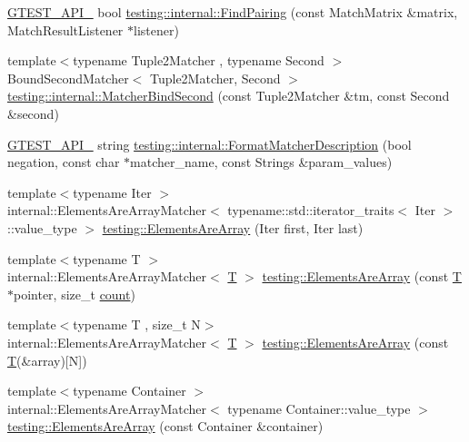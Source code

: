\begin{DoxyCompactItemize}
\hyperlink{gtest-port_8h_aa73be6f0ba4a7456180a94904ce17790}{G\+T\+E\+S\+T\+\_\+\+A\+P\+I\+\_\+} bool \hyperlink{namespacetesting_1_1internal_af2bd2e350b56422a3d9d3b986ac1df0e}{testing\+::internal\+::\+Find\+Pairing} (const Match\+Matrix \&matrix, Match\+Result\+Listener $\ast$listener)
\item 
{\footnotesize template$<$typename Tuple2\+Matcher , typename Second $>$ }\\Bound\+Second\+Matcher$<$ Tuple2\+Matcher, Second $>$ \hyperlink{namespacetesting_1_1internal_a31eb77a2bb0ca713d6ef07d8a3b9af9e}{testing\+::internal\+::\+Matcher\+Bind\+Second} (const Tuple2\+Matcher \&tm, const Second \&second)
\item 
\hyperlink{gtest-port_8h_aa73be6f0ba4a7456180a94904ce17790}{G\+T\+E\+S\+T\+\_\+\+A\+P\+I\+\_\+} string \hyperlink{namespacetesting_1_1internal_a593b52fcbb46a765a31850661b1960f4}{testing\+::internal\+::\+Format\+Matcher\+Description} (bool negation, const char $\ast$matcher\+\_\+name, const Strings \&param\+\_\+values)
\item 
{\footnotesize template$<$typename Iter $>$ }\\internal\+::\+Elements\+Are\+Array\+Matcher$<$ typename\+::std\+::iterator\+\_\+traits$<$ Iter $>$\+::value\+\_\+type $>$ \hyperlink{namespacetesting_ae2eee06e7ddbf5f5372fd24372e9703f}{testing\+::\+Elements\+Are\+Array} (Iter first, Iter last)
\item 
{\footnotesize template$<$typename T $>$ }\\internal\+::\+Elements\+Are\+Array\+Matcher$<$ \hyperlink{functions__7_8js_adf1f3edb9115acb0a1e04209b7a9937b}{T} $>$ \hyperlink{namespacetesting_abf5c2219b4e6a7542368b5f68eadd007}{testing\+::\+Elements\+Are\+Array} (const \hyperlink{functions__7_8js_adf1f3edb9115acb0a1e04209b7a9937b}{T} $\ast$pointer, size\+\_\+t \hyperlink{gmock__stress__test_8cc_afd9db40e3361ae09188795e8cbe19752}{count})
\item 
{\footnotesize template$<$typename T , size\+\_\+t N$>$ }\\internal\+::\+Elements\+Are\+Array\+Matcher$<$ \hyperlink{functions__7_8js_adf1f3edb9115acb0a1e04209b7a9937b}{T} $>$ \hyperlink{namespacetesting_ac5895c9867d6b976351446a043dcdd66}{testing\+::\+Elements\+Are\+Array} (const \hyperlink{functions__7_8js_adf1f3edb9115acb0a1e04209b7a9937b}{T}(\&array)\mbox{[}N\mbox{]})
\item 
{\footnotesize template$<$typename Container $>$ }\\internal\+::\+Elements\+Are\+Array\+Matcher$<$ typename Container\+::value\+\_\+type $>$ \hyperlink{namespacetesting_ad257747adbe056feaa92f449063d681f}{testing\+::\+Elements\+Are\+Array} (const Container \&container)

\end{DoxyCompactItemize}
